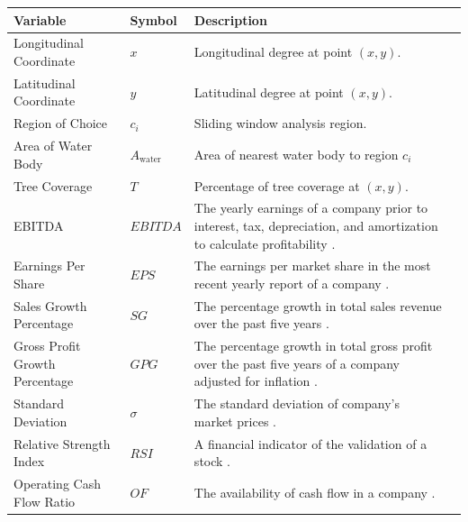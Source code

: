 \documentclass{mcmthesis}
\begin{document}
\begin{table}[!htbp]
\renewcommand{\arraystretch}{1.3}
    \begin{tabularx}{\textwidth}{p{} lXl}
    \toprule
    \textbf{Variable}           & \textbf{Symbol} & \textbf{Description}    \\ \midrule
    \raggedright Longitudinal Coordinate  & $x$  & Longitudinal degree at point $(x, y)$. \\
    \raggedright Latitudinal Coordinate  & $y$  & Latitudinal degree at point $(x, y)$. \\
    Region of Choice & $c_i$               &  Sliding window analysis region.  \\
    Area of Water Body & $A_{\text{water}}$               &  Area of nearest water body to region $c_i$  \\
    \raggedright Tree Coverage  & $T$  & Percentage of tree coverage at $(x, y)$. \\
    EBITDA & $EBITDA$               &  The yearly earnings of a company prior to interest, tax, depreciation, and amortization to calculate profitability \cite{adam_hayes_ebitda_nodate}.
    \\
    Earnings Per Share & $EPS$               &  The earnings per market share in the most recent yearly report of a company \cite{jason_fernando_earnings_nodate}.
    \\
    Sales Growth Percentage & $SG$               &  The percentage growth in total sales revenue over the past five years \cite{james_chen_growth_nodate}.
    \\
    Gross Profit Growth Percentage & $GPG$               &  The percentage growth in total gross profit over the past five years of a company adjusted for inflation \cite{james_chen_growth_nodate}. \\
  Standard Deviation & $\sigma$ & The standard deviation of company's market prices \cite{marshall_hargrave_standard_nodate}. \\
   Relative Strength Index & $RSI$         & A financial indicator of the validation of a stock \cite{jason_fernando_relative_nodate}.   \\
    Operating Cash Flow Ratio  & $OF$               & The availability of cash flow in a company \cite{marshall_hargrave_operating_nodate}.
    \\
    \bottomrule
    \end{tabularx}
    \end{table}
\end{document}
